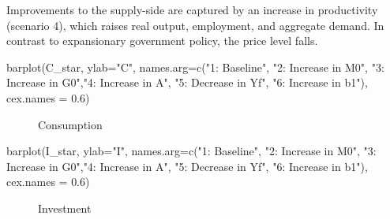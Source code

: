 \documentclass[
  letterpaper,
  DIV=11,
  numbers=noendperiod]{scrreprt}
\newenvironment{Shaded}{\begin{snugshade}}{\end{snugshade}}
\newcommand{\AttributeTok}[1]{\textcolor[rgb]{0.40,0.45,0.13}{#1}}
\newcommand{\FloatTok}[1]{\textcolor[rgb]{0.68,0.00,0.00}{#1}}
\newcommand{\FunctionTok}[1]{\textcolor[rgb]{0.28,0.35,0.67}{#1}}
\newcommand{\NormalTok}[1]{\textcolor[rgb]{0.00,0.23,0.31}{#1}}
\newcommand{\StringTok}[1]{\textcolor[rgb]{0.13,0.47,0.30}{#1}}
\begin{document}
Improvements to the supply-side are captured by an increase in
productivity (scenario 4), which raises real output, employment, and
aggregate demand. In contrast to expansionary government policy, the
price level falls.

\begin{Shaded}
\begin{Highlighting}[]
\FunctionTok{barplot}\NormalTok{(C\_star, }\AttributeTok{ylab=}\StringTok{"C"}\NormalTok{,  }\AttributeTok{names.arg=}\FunctionTok{c}\NormalTok{(}\StringTok{"1: Baseline"}\NormalTok{, }\StringTok{"2: Increase in M0"}\NormalTok{, }\StringTok{"3: Increase in G0"}\NormalTok{,}\StringTok{"4: Increase in A"}\NormalTok{, }\StringTok{"5: Decrease in Yf"}\NormalTok{, }\StringTok{"6: Increase in b1"}\NormalTok{), }\AttributeTok{cex.names =} \FloatTok{0.6}\NormalTok{)}
\end{Highlighting}
\end{Shaded}

\begin{figure}[H]


\caption{\label{fig-consumption}Consumption}

\end{figure}%

\begin{Shaded}
\begin{Highlighting}[]
\FunctionTok{barplot}\NormalTok{(I\_star, }\AttributeTok{ylab=}\StringTok{"I"}\NormalTok{,  }\AttributeTok{names.arg=}\FunctionTok{c}\NormalTok{(}\StringTok{"1: Baseline"}\NormalTok{, }\StringTok{"2: Increase in M0"}\NormalTok{, }\StringTok{"3: Increase in G0"}\NormalTok{,}\StringTok{"4: Increase in A"}\NormalTok{, }\StringTok{"5: Decrease in Yf"}\NormalTok{, }\StringTok{"6: Increase in b1"}\NormalTok{), }\AttributeTok{cex.names =} \FloatTok{0.6}\NormalTok{)}
\end{Highlighting}
\end{Shaded}

\begin{figure}[H]


\caption{\label{fig-investment}Investment}

\end{figure}%
\end{document}
